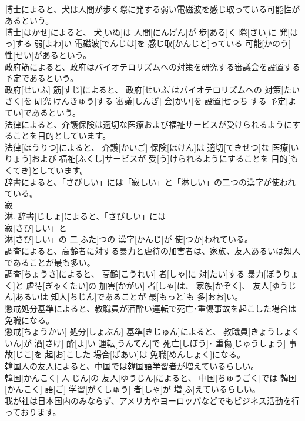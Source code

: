 \documentclass[8pt]{extreport}
\begin{document}
\begin{CJK}{UTF8}{min}
\\	博士によると、犬は人間が歩く際に発する弱い電磁波を感じ取っている可能性があるという。	
\\	博士[はかせ]によると、 犬[いぬ]は 人間[にんげん]が 歩[ある]く 際[さい]に 発[はっ]する 弱[よわ]い 電磁波[でんじは]を 感じ取[かんじと]っている 可能[かのう] 性[せい]があるという。
\\	政府筋によると、政府はバイオテロリズムへの対策を研究する審議会を設置する予定であるという。	
\\	政府[せいふ] 筋[すじ]によると、 政府[せいふ]はバイオテロリズムへの 対策[たいさく]を 研究[けんきゅう]する 審議[しんぎ] 会[かい]を 設置[せっち]する 予定[よてい]であるという。
\\	法律によると、介護保険は適切な医療および福祉サービスが受けられるようにすることを目的としています。	
\\	法律[ほうりつ]によると、 介護[かいご] 保険[ほけん]は 適切[てきせつ]な 医療[いりょう]および 福祉[ふくし]サービスが 受[う]けられるようにすることを 目的[もくてき]としています。
\\	辞書によると、「さびしい」には「寂しい」と「淋しい」の二つの漢字が使われている。	
\\	寂 
\\	淋.	辞書[じしょ]によると、「さびしい」には
\\	寂[さび]しい」と
\\	淋[さび]しい」の 二[ふた]つの 漢字[かんじ]が 使[つか]われている。
\\	調査によると、高齢者に対する暴力と虐待の加害者は、家族、友人あるいは知人であることが最も多い。	
\\	調査[ちょうさ]によると、 高齢[こうれい] 者[しゃ]に 対[たい]する 暴力[ぼうりょく]と 虐待[ぎゃくたい]の 加害[かがい] 者[しゃ]は、 家族[かぞく]、 友人[ゆうじん]あるいは 知人[ちじん]であることが 最[もっと]も 多[おお]い。
\\	懲戒処分基準によると、教職員が酒酔い運転で死亡･重傷事故を起こした場合は免職になる。	
\\	懲戒[ちょうかい] 処分[しょぶん] 基準[きじゅん]によると、 教職員[きょうしょくいん]が 酒[さけ] 酔[よ]い 運転[うんてん]で 死亡[しぼう]･ 重傷[じゅうしょう] 事故[じこ]を 起[お]こした 場合[ばあい]は 免職[めんしょく]になる。
\\	韓国人の友人によると、中国では韓国語学習者が増えているらしい。	
\\	韓国[かんこく] 人[じん]の 友人[ゆうじん]によると、 中国[ちゅうごく]では 韓国[かんこく] 語[ご] 学習[がくしゅう] 者[しゃ]が 増[ふ]えているらしい。
\\	我が社は日本国内のみならず、アメリカやヨーロッパなどでもビジネス活動を行っております。	

\end{CJK}
\end{document}
